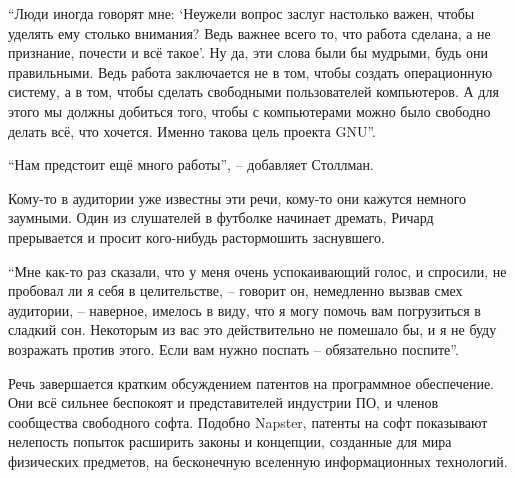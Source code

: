 \enquote{Люди иногда говорят мне: \enquote{Неужели вопрос заслуг настолько важен, чтобы уделять ему столько внимания? Ведь важнее всего то, что работа сделана, а не признание, почести и всё такое}. Ну да, эти слова были бы мудрыми, будь они правильными. Ведь работа заключается не в том, чтобы создать операционную систему, а в том, чтобы сделать свободными пользователей компьютеров. А для этого мы должны добиться того, чтобы с компьютерами можно было свободно делать всё, что хочется. Именно такова цель проекта GNU}.

\enquote{Нам предстоит ещё много работы}, -- добавляет Столлман.

Кому-то в аудитории уже известны эти речи, кому-то они кажутся немного заумными. Один из слушателей в футболке начинает дремать, Ричард прерывается и просит кого-нибудь растормошить заснувшего.

\enquote{Мне как-то раз сказали, что у меня очень успокаивающий голос, и спросили, не пробовал ли я себя в целительстве, -- говорит он, немедленно вызвав смех аудитории, -- наверное, имелось в виду, что я могу помочь вам погрузиться в сладкий сон. Некоторым из вас это действительно не помешало бы, и я не буду возражать против этого. Если вам нужно поспать -- обязательно поспите}.

Речь завершается кратким обсуждением патентов на программное обеспечение. Они всё сильнее беспокоят и представителей индустрии ПО, и членов сообщества свободного софта. Подобно Napster, патенты на софт показывают нелепость попыток расширить законы и концепции, созданные для мира физических предметов, на бесконечную вселенную информационных технологий.

